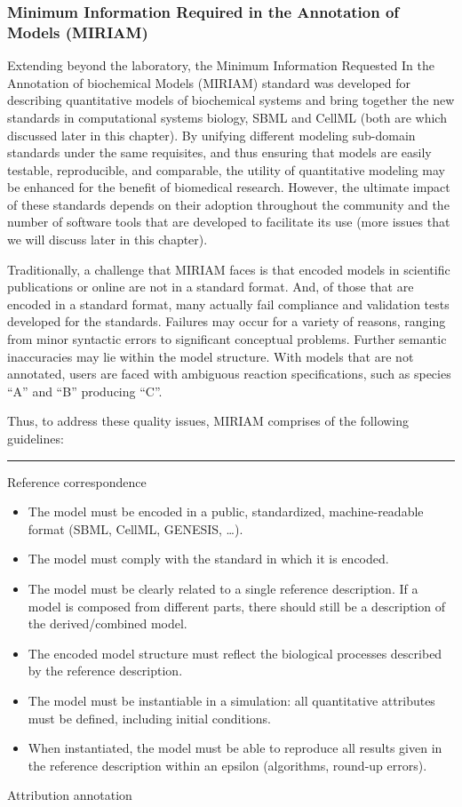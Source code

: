 \subsubsection{Minimum Information Required in the Annotation of Models
(MIRIAM)}

Extending beyond the laboratory, the Minimum Information Requested In
the Annotation of biochemical Models (MIRIAM) standard
\autocite{novere2005minimum} \autocite{le2006model} was developed for
describing quantitative models of biochemical systems and bring together
the new standards in computational systems biology, SBML and CellML
(both are which discussed later in this chapter). By unifying different
modeling sub-domain standards under the same requisites, and thus
ensuring that models are easily testable, reproducible, and comparable,
the utility of quantitative modeling may be enhanced for the benefit of
biomedical research. However, the ultimate impact of these standards
depends on their adoption throughout the community and the number of
software tools that are developed to facilitate its use (more issues
that we will discuss later in this chapter).

Traditionally, a challenge that MIRIAM faces is that encoded models in
scientific publications or online are not in a standard format. And, of
those that are encoded in a standard format, many actually fail
compliance and validation tests developed for the standards. Failures
may occur for a variety of reasons, ranging from minor syntactic errors
to significant conceptual problems. Further semantic inaccuracies may
lie within the model structure. With models that are not annotated,
users are faced with ambiguous reaction specifications, such as species
``A'' and ``B'' producing ``C''.

Thus, to address these quality issues, MIRIAM comprises of the following
guidelines:

\begin{center}\rule{3in}{0.4pt}\end{center}

Reference correspondence

\begin{itemize}
\item
  The model must be encoded in a public, standardized, machine-readable
  format (SBML, CellML, GENESIS, \ldots{}).
\item
  The model must comply with the standard in which it is encoded.
\item
  The model must be clearly related to a single reference description.
  If a model is composed from different parts, there should still be a
  description of the derived/combined model.
\item
  The encoded model structure must reflect the biological processes
  described by the reference description.
\item
  The model must be instantiable in a simulation: all quantitative
  attributes must be defined, including initial conditions.
\item
  When instantiated, the model must be able to reproduce all results
  given in the reference description within an epsilon (algorithms,
  round-up errors).
\end{itemize}
Attribution annotation

